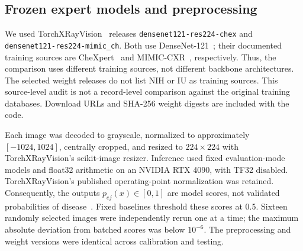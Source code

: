 \documentclass[10pt,a4paper]{article}
\begin{document}
\begin{table}[htbp]
\centering\small\setlength{\tabcolsep}{3.5pt}
\caption{Composition of the analysed cohorts. Source sex is the datasets' recorded Patient Gender field and is not interpreted as biological sex or gender identity. IU report-level descriptors other than image counts and positive targets were not available.}\label{tab:characteristics}

\end{table}

\subsection{Frozen expert models and preprocessing}
We used TorchXRayVision~\cite{xrv} releases \texttt{densenet121-res224-chex} and \texttt{densenet121-res224-mimic\_ch}. Both use DenseNet-121~\cite{densenet}; their documented training sources are CheXpert~\cite{chex} and MIMIC-CXR~\cite{mimic}, respectively. Thus, the comparison uses different training sources, not different backbone architectures. The selected weight releases do not list NIH or IU as training sources. This source-level audit is not a record-level comparison against the original training databases. Download URLs and SHA-256 weight digests are included with the code.

Each image was decoded to grayscale, normalized to approximately $[-1024,1024]$, centrally cropped, and resized to $224\times224$ with TorchXRayVision's scikit-image resizer. Inference used fixed evaluation-mode models and float32 arithmetic on an NVIDIA RTX 4090, with TF32 disabled. TorchXRayVision's published operating-point normalization was retained. Consequently, the outputs $p_{ej}(x)\in[0,1]$ are model scores, not validated probabilities of disease~\cite{guo2017calibration}. Fixed baselines threshold these scores at 0.5. Sixteen randomly selected images were independently rerun one at a time; the maximum absolute deviation from batched scores was below $10^{-6}$. The preprocessing and weight versions were identical across calibration and testing.
\end{document}
